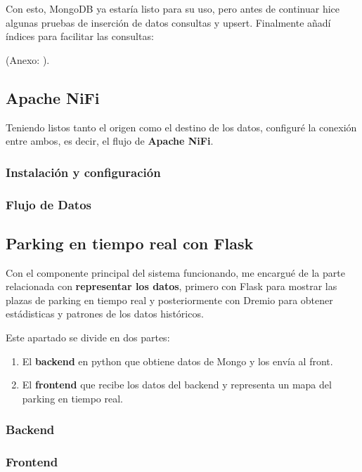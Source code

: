 \documentclass{../../../miPlantilla}
\begin{document}
Con esto, MongoDB ya estaría listo para su uso, pero antes de continuar hice algunas pruebas de inserción de datos consultas y upsert. Finalmente añadí índices
para facilitar las consultas:
\begin{center}
  {\small(Anexo: )}.
\end{center}

\newpage

\subsection{Apache NiFi}
Teniendo listos tanto el origen como el destino de los datos, configuré la conexión entre ambos, es decir, el flujo de \textbf{Apache NiFi}.

\subsubsection{Instalación y configuración}

\subsubsection{Flujo de Datos}

\newpage

\subsection{Parking en tiempo real con Flask}
Con el componente principal del sistema funcionando, me encargué de la parte relacionada con \textbf{representar los datos}, primero con Flask para mostrar las plazas de parking
en tiempo real y posteriormente con Dremio para obtener estádisticas y patrones de los datos históricos.

Este apartado se divide en dos partes:
\begin{enumerate}
  \item El \textbf{backend} en python que obtiene datos de Mongo y los envía al front.
  \item El \textbf{frontend} que recibe los datos del backend y representa un mapa del parking en tiempo real.
\end{enumerate}

\subsubsection{Backend}

\subsubsection{Frontend}
\end{document}
